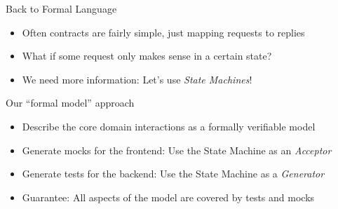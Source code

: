 \begin{frame}[fragile]{Back to Formal Language}
  \begin{itemize}[<+->]
  \item Often contracts are fairly simple, just mapping requests to replies
  \item What if some request only makes sense in a certain state?
  \item We need more information: Let's use \emph{State Machines}!
  \end{itemize}
\end{frame}


\begin{frame}[fragile]{Our ``formal model'' approach}

  \begin{itemize}[<+->]
  \item Describe the core domain interactions as a formally verifiable model
  \item Generate mocks for the frontend: Use the State Machine as an \emph{Acceptor}
  \item Generate tests for the backend: Use the State Machine as a \emph{Generator}
  \item Guarantee: All aspects of  the model are covered by tests and mocks
  \end{itemize}

\end{frame}

